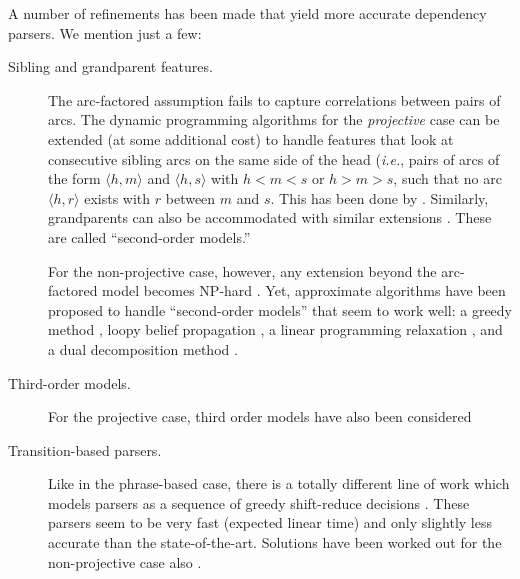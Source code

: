 A number of refinements has been made that yield more accurate dependency parsers. We mention just a few: 
\begin{description}
\item[Sibling and grandparent features.] 
The arc-factored assumption fails to capture correlations between pairs of arcs. 
The dynamic programming algorithms for the \emph{projective} case can be extended (at some additional cost) to 
handle features that look at consecutive sibling arcs on the same side of the head 
(\emph{i.e.}, pairs of arcs of the form $\langle h,m \rangle$ and $\langle h,s \rangle$ 
with $h < m < s$ or $h > m > s$, such that no arc $\langle h,r \rangle$ exists with $r$ between $m$ and $s$. 
This has been done by \citet{Eisner1999}. Similarly, grandparents can also be accommodated 
with similar extensions \citep{Carreras2007}. These are called ``second-order models.''

For the non-projective case, however, any extension beyond the arc-factored model becomes NP-hard \citep{McDonald2007}. 
Yet, approximate algorithms have been proposed to handle ``second-order models'' that seem to work well: 
a greedy method \citep{McDonald2006CoNLL}, 
loopy belief propagation \citep{DSmith2008}, a linear programming relaxation \citep{Martins2009ACL}, 
and a dual decomposition method \citep{Koo2010EMNLP}. 
\item[Third-order models.]
For the projective case, third order models have also been considered \citep{Koo2010}
\item[Transition-based parsers.]
Like in the phrase-based case, there is a totally different line of work which models parsers as a sequence of greedy 
shift-reduce decisions \citep{Nivre2006CoNLL,Huang2010}. These parsers seem to be very fast (expected linear time) 
and only slightly less accurate than 
the state-of-the-art. Solutions have been worked out for the non-projective case also \citep{Nivre2009}. 
\end{description}

